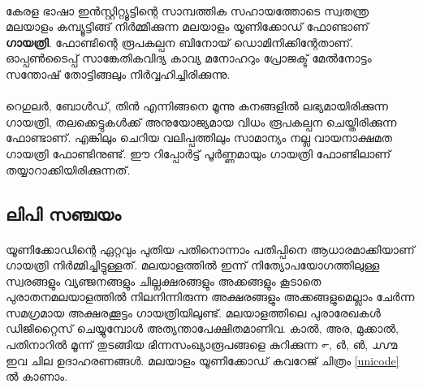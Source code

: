 \documentclass[12pt]{article}
\begin{document}
	\paragraph{}
	കേരള ഭാഷാ ഇന്‍സ്റ്റിറ്റ്യൂട്ടിന്റെ സാമ്പത്തിക സഹായത്തോടെ സ്വതന്ത്ര മലയാളം കമ്പ്യൂട്ടിങ്ങ് നിര്‍മ്മിക്കുന്ന മലയാളം യൂണിക്കോഡ് ഫോണ്ടാണ് \textbf{ഗായത്രി}. ഫോണ്ടിന്റെ രൂപകല്പന ബിനോയ് ഡൊമിനിക്കിന്റേതാണ്. ഓപ്പണ്‍ടൈപ്പ് സാങ്കേതികവിദ്യ കാവ്യ മനോഹറും പ്രോജക്ട് മേല്‍നോട്ടം സന്തോഷ് തോട്ടിങ്ങലും നിര്‍വ്വഹിച്ചിരിക്കുന്നു.
	
	\paragraph{}
	റെഗുലര്‍, ബോള്‍ഡ്, തിന്‍ എന്നിങ്ങനെ മൂന്നു കനങ്ങളില്‍ ലഭ്യമായിരിക്കുന്ന ഗായത്രി, തലക്കെട്ടുകള്‍ക്ക് അനുയോജ്യമായ വിധം രൂപകല്പന ചെയ്തിരിക്കുന്ന ഫോണ്ടാണ്. എങ്കിലും ചെറിയ വലിപ്പത്തിലും സാമാന്യം നല്ല വായനാക്ഷമത ഗായത്രി ഫോണ്ടിനുണ്ട്. ഈ റിപ്പോര്‍ട്ട് പൂര്‍ണ്ണമായും ഗായത്രി ഫോണ്ടിലാണ് തയ്യാറാക്കിയിരിക്കുന്നത്.
	
	\subsection{ലിപി സഞ്ചയം}
	
	\paragraph{}
	
	യൂണിക്കോഡിന്റെ ഏറ്റവും പുതിയ പതിനൊന്നാം പതിപ്പിനെ ആധാരമാക്കിയാണ് ഗായത്രി നിര്‍മ്മിച്ചിട്ടുള്ളത്. മലയാളത്തില്‍ ഇന്ന് നിത്യോപയോഗത്തിലുള്ള സ്വരങ്ങളും വ്യഞ്ജനങ്ങളും ചില്ലക്ഷരങ്ങളും അക്കങ്ങളും കൂടാതെ പുരാതനമലയാളത്തില്‍ നിലനിന്നിരുന്ന അക്ഷരങ്ങളും അക്കങ്ങളുമെല്ലാം ചേര്‍ന്ന സമഗ്രമായ അക്ഷരക്കൂട്ടം ഗായത്രിയിലുണ്ട്. മലയാളത്തിലെ പുരാരേഖകള്‍ ഡിജിറ്റൈസ് ചെയ്യുമ്പോള്‍ അത്യന്താപേക്ഷിതമാണിവ. കാല്‍, അര, മുക്കാല്‍, പതിനാറില്‍ മൂന്ന് തുടങ്ങിയ ഭിന്നസംഖ്യാരൂപങ്ങളെ കുറിക്കുന്ന ൳, ൴, ൵, ൸  ഇവ ചില ഉദാഹരണങ്ങള്‍. മലയാളം യൂണിക്കോഡ് കവറേജ് ചിത്രം \ref{unicode} ല്‍ കാണാം.
	
\end{document}
